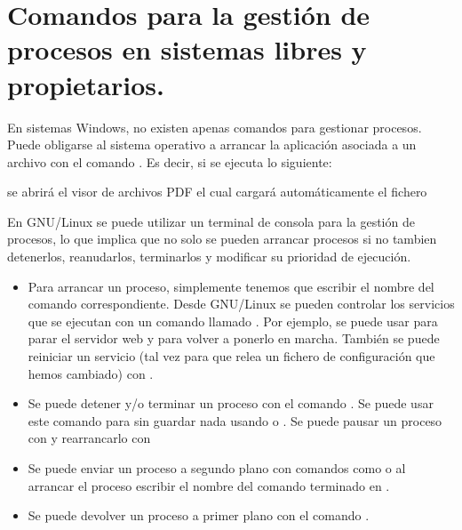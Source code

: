 \documentclass[letterpaper,10pt,spanish]{sphinxmanual}
\begin{document}
\section{Comandos para la gestión de procesos en sistemas libres y propietarios.}
\label{\detokenize{textos/tema1:comandos-para-la-gestion-de-procesos-en-sistemas-libres-y-propietarios}}
En sistemas Windows, no existen apenas comandos para gestionar procesos. Puede obligarse al sistema operativo a arrancar la aplicación asociada a un archivo con el comando . Es decir, si se ejecuta lo siguiente:

\begin{sphinxVerbatim}[commandchars=\\\{\}]
 
\end{sphinxVerbatim}

se abrirá el visor de archivos PDF el cual cargará automáticamente el fichero 

En GNU/Linux se puede utilizar un terminal de consola para la gestión de procesos, lo que implica que no solo se pueden arrancar procesos si no tambien detenerlos, reanudarlos, terminarlos y modificar su prioridad de ejecución.
\begin{itemize}
\item {} 
Para arrancar un proceso, simplemente tenemos que escribir el nombre del comando correspondiente. Desde GNU/Linux se pueden controlar los servicios que se ejecutan con un comando llamado . Por ejemplo, se puede usar  para parar el servidor web y  para volver a ponerlo en marcha. También se puede reiniciar un servicio (tal vez para que relea un fichero de configuración que hemos cambiado) con .

\item {} 
Se puede detener y/o terminar un proceso con el comando . Se puede usar este comando para  sin guardar nada usando  o . Se puede pausar un proceso con  y rearrancarlo con 

\item {} 
Se puede enviar un proceso a segundo plano con comandos como  o al arrancar el proceso escribir el nombre del comando terminado en \sphinxcode{\sphinxupquote{\&}}.

\item {} 
Se puede devolver un proceso a primer plano con el comando .

\end{itemize}
\end{document}
